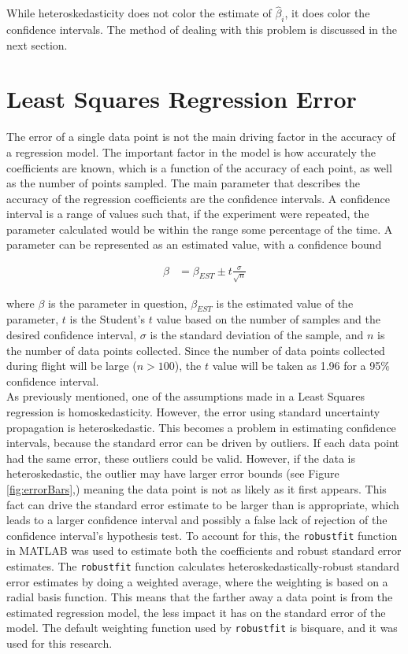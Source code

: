 While heteroskedasticity does not color the estimate of $\hat{\beta}_i$, it does color the confidence intervals. The method of dealing with this problem is discussed in the next section.


\section*{Least Squares Regression Error}
The error of a single data point is not the main driving factor in the accuracy of a regression model. The important factor in the model is how accurately the coefficients are known, which is a function of the accuracy of each point, as well as the number of points sampled. The main parameter that describes the accuracy of the regression coefficients are the confidence intervals. A confidence interval is a range of values such that, if the experiment were repeated, the parameter calculated would be within the range some percentage of the time. A parameter can be represented as an estimated value, with a confidence bound

\begin{align}
\label{confidenceInterval}
\beta &= \beta_{EST} \pm t\frac{\sigma}{\sqrt{n}}
\end{align}

where $\beta$ is the parameter in question, $\beta_{EST}$ is the estimated value of the parameter, $t$ is the Student's $t$ value based on the number of samples and the desired confidence interval, $\sigma$ is the standard deviation of the sample, and $n$ is the number of data points collected. Since the number of data points collected during flight will be large ($n>100$), the $t$ value will be taken as 1.96 for a 95\% confidence interval.\\
As previously mentioned, one of the assumptions made in a Least Squares regression is homoskedasticity. However, the error using standard uncertainty propagation is heteroskedastic. This becomes a problem in estimating confidence intervals, because the standard error can be driven by outliers. If each data point had the same error, these outliers could be valid. However, if the data is heteroskedastic, the outlier may have larger error bounds (see Figure \ref{fig:errorBars},) meaning the data point is not as likely as it first appears. This fact can drive the standard error estimate to be larger than is appropriate, which leads to a larger confidence interval and possibly a false lack of rejection of the confidence interval's hypothesis test. To account for this, the \texttt{robustfit} function in MATLAB  was used to estimate both the coefficients and robust standard error estimates. The \texttt{robustfit} function calculates heteroskedastically-robust standard error estimates by doing a weighted average, where the weighting is based on a radial basis function. This means that the farther away a data point is from the estimated regression model, the less impact it has on the standard error of the model. The default weighting function used by \texttt{robustfit} is bisquare, and it was used for this research.

